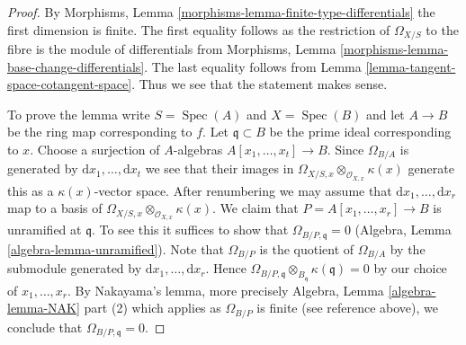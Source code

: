 \documentclass[10pt,a4paper]{amsart}
\theoremstyle{plain}
\theoremstyle{definition}
\theoremstyle{remark}
\numberwithin{equation}{subsection}
\def\Spec{\mathop{\mathrm{Spec}}}
\begin{document}
\begin{proof}
By Morphisms, Lemma \ref{morphisms-lemma-finite-type-differentials}
the first dimension is finite.
The first equality follows as the restriction of
$\Omega_{X/S}$ to the fibre is the module of differentials
from Morphisms, Lemma
\ref{morphisms-lemma-base-change-differentials}.
The last equality follows from Lemma \ref{lemma-tangent-space-cotangent-space}.
Thus we see that the statement makes sense.

\medskip\noindent
To prove the lemma write $S = \Spec(A)$ and $X = \Spec(B)$ and let
$A \to B$ be the ring map corresponding to $f$. Let $\mathfrak q \subset B$
be the prime ideal corresponding to $x$. Choose a surjection of $A$-algebras
$A[x_1, \ldots, x_t] \to B$. Since $\Omega_{B/A}$ is generated by
$\text{d}x_1, \ldots, \text{d}x_t$ we see that their images in
$\Omega_{X/S, x} \otimes_{\mathcal{O}_{X, x}} \kappa(x)$ generate
this as a $\kappa(x)$-vector space. After renumbering we may assume
that $\text{d}x_1, \ldots, \text{d}x_r$ map to a basis of
$\Omega_{X/S, x} \otimes_{\mathcal{O}_{X, x}} \kappa(x)$.
We claim that $P = A[x_1, \ldots, x_r] \to B$ is unramified at $\mathfrak q$.
To see this it suffices to show that $\Omega_{B/P, \mathfrak q} = 0$
(Algebra, Lemma \ref{algebra-lemma-unramified}).
Note that $\Omega_{B/P}$ is the quotient of $\Omega_{B/A}$ by the
submodule generated by $\text{d}x_1, \ldots, \text{d}x_r$.
Hence
$\Omega_{B/P, \mathfrak q} \otimes_{B_\mathfrak q} \kappa(\mathfrak q) = 0$
by our choice of $x_1, \ldots, x_r$.
By Nakayama's lemma, more precisely Algebra, Lemma \ref{algebra-lemma-NAK}
part (2) which applies as $\Omega_{B/P}$ is finite (see reference above),
we conclude that $\Omega_{B/P, \mathfrak q} = 0$.
\end{proof}
\end{document}
